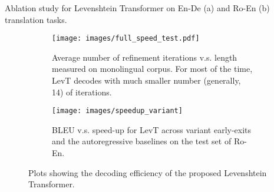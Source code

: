 \documentclass{article}
\begin{document}
\begin{table}[t]\centering
    \caption{Ablation study for Levenshtein Transformer on En-De (a) and  Ro-En (b) translation tasks.}
\end{table}

\begin{figure}[t]
    \centering
    \begin{subfigure}[b]{0.58\textwidth}
    \raggedleft
    \texttt{[image: images/full\_speed\_test.pdf]}
    \caption{\label{fig.iter_length} Average number of refinement iterations v.s. length measured on monolingual corpus. 
                For most of the time, LevT decodes with much smaller number (generally, 14) of iterations.}
    \end{subfigure}
    \hspace{2.5pt}
    \begin{subfigure}[b]{0.385 \textwidth}
    \raggedright
    \texttt{[image: images/speedup\_variant]}
    \caption{\label{fig.speedup} BLEU v.s. speed-up for LevT across variant early-exits and the autoregressive baselines on the test set of Ro-En. }
    \end{subfigure}
    \caption{\label{fig.efficiency}Plots showing the decoding efficiency of the proposed Levenshtein Transformer.}
    \vspace{-5pt}
\end{figure}
\end{document}

